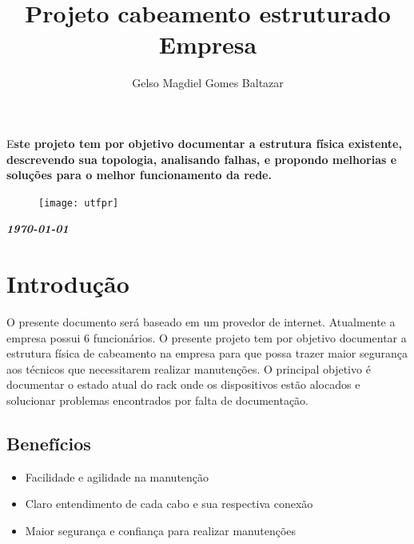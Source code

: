 \documentclass[	DIV=calc,%
paper=a4,%
fontsize=12pt,%
onecolumn]{scrartcl}	 					%
\title{Projeto cabeamento estruturado Empresa}					%
\author{Gelso Magdiel Gomes Baltazar}  	%
\date{}																				%
\newcommand{\initial}[1]{%
	\lettrine[lines=3,lhang=0.3,nindent=0em]{
		\color{DarkGoldenrod}
		{\textsf{#1}}}{}}
\begin{document}
	\maketitle
	\thispagestyle{fancy} 	
	\thispagestyle{empty}		%
	
	
	
	
	\initial{E}\textbf{ste projeto tem por objetivo documentar a estrutura física existente, descrevendo sua topologia, analisando falhas, e propondo melhorias e soluções para o melhor funcionamento da rede.}
	
	\begin{figure}
		\centering
		\texttt{[image: utfpr]}
	\end{figure}
	
	\vspace{3cm}
	\centerline{\textit{\textbf{\today}}}
	
	\clearpage
	\renewcommand*\listfigurename{Lista de figuras}
	\listoffigures
	
	\renewcommand*\listtablename{Lista de tabelas}
	\listoftables
	
	
	
	
	\clearpage
	\renewcommand{\contentsname}{Sumário}
	\tableofcontents
	\clearpage
	
	\section{Introdução}
	
	O presente documento será baseado em um provedor de internet. Atualmente a empresa possui 6 funcionários.
		O presente projeto tem por objetivo documentar a estrutura física de cabeamento na empresa para que possa trazer maior segurança aos técnicos que necessitarem realizar manutenções.
		O principal objetivo é documentar o estado atual do rack onde os dispositivos estão alocados e solucionar problemas encontrados por falta de documentação.		
	
	
	\subsection{Benefícios}
		\begin{itemize}
		\item Facilidade e agilidade na manutenção
		\item Claro entendimento de cada cabo e sua respectiva conexão
		\item Maior segurança e confiança para realizar manutenções
		\end{itemize}
	
\end{document}
